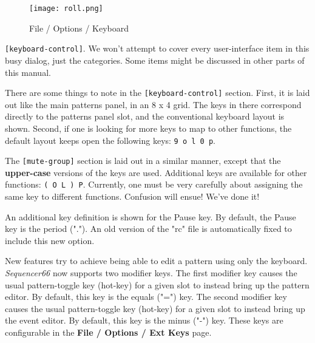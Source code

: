 \begin{figure}[H]
   \centering 
   \texttt{[image: roll.png]}
   \caption{File / Options / Keyboard}
   \label{fig:seq66_menu_file_options_keyboard}
\end{figure}

   \texttt{[keyboard-control]}.
   We won't attempt to cover every user-interface item in this busy
   dialog, just the categories.  Some items might be discussed in other parts
   of this manual.

   There are some things to note in the \texttt{[keyboard-control]} section.
   First, it is laid out like the main patterns panel, in an 8 x 4 grid.
   The keys in there correspond directly to the patterns panel slot, and the
   conventional keyboard layout is shown.
   Second, if one is looking for more keys to map to other functions, the
   default layout keeps open the following keys:
   \texttt{9 o l 0 p}.

   The \texttt{[mute-group]} section is laid out in a similar manner, except
   that the \textbf{upper-case} versions of the keys are used.  Additional keys
   are available for other functions:
   \texttt{( O L ) P}.
   Currently, one must be very carefully about assigning the same key to
   different functions.  Confusion will ensue!  We've done it!

   An additional key definition is shown for the Pause key.
   By default, the Pause key is the period (".").  An old version of
   the "rc" file is automatically fixed to include this new option.


   New features try to achieve being able to edit a pattern using only the
   keyboard.  \textsl{Sequencer66} now supports two modifier keys.
   The first modifier key causes the usual pattern-toggle key (hot-key) for a
   given slot to instead bring up the pattern editor.  By default, this key is
   the equals ("=") key.
   The second modifier key causes the usual
   pattern-toggle key (hot-key) for a given slot to instead bring up the event
   editor.  By default, this key is the minus ("-") key.
   These keys are configurable in the
   \textbf{File / Options / Ext Keys} page.

